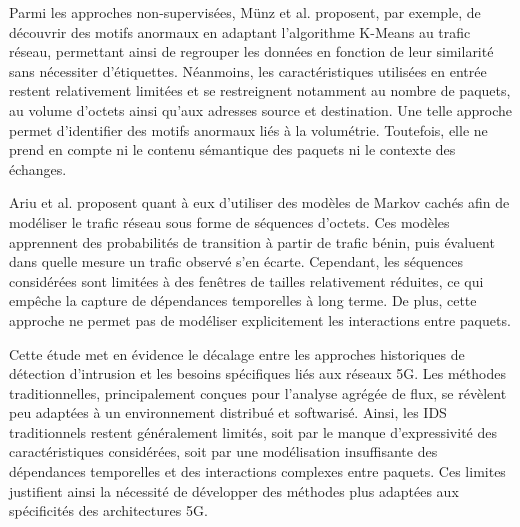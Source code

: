 \documentclass[a4paper,11pt,twoside]{StyleThese}
\begin{document}


Parmi les approches non-supervisées, Münz et al. \cite{kmeans} proposent, par exemple, de découvrir des motifs anormaux en adaptant l’algorithme K-Means au trafic réseau, permettant ainsi de regrouper les données en fonction de leur similarité sans nécessiter d’étiquettes. Néanmoins, les caractéristiques utilisées en entrée restent relativement limitées et se restreignent notamment au nombre de paquets, au volume d’octets ainsi qu’aux adresses source et destination. Une telle approche permet d’identifier des motifs anormaux liés à la volumétrie. Toutefois, elle ne prend en compte ni le contenu sémantique des paquets ni le contexte des échanges.

Ariu et al. \cite{markov} proposent quant à eux d'utiliser des modèles de Markov cachés afin de modéliser le trafic réseau sous forme de séquences d’octets. Ces modèles apprennent des probabilités de transition à partir de trafic bénin, puis évaluent dans quelle mesure un trafic observé s’en écarte. Cependant, les séquences considérées sont limitées à des fenêtres de tailles relativement réduites, ce qui empêche la capture de dépendances temporelles à long terme. De plus, cette approche ne permet pas de modéliser explicitement les interactions entre paquets.

Cette étude met en évidence le décalage entre les approches historiques de détection d’intrusion et les besoins spécifiques liés aux réseaux 5G. Les méthodes traditionnelles, principalement conçues pour l’analyse agrégée de flux, se révèlent peu adaptées à un environnement distribué et softwarisé. Ainsi, les IDS traditionnels restent généralement limités, soit par le manque d'expressivité des caractéristiques considérées, soit par une modélisation insuffisante des dépendances temporelles et des interactions complexes entre paquets. Ces limites justifient ainsi la nécessité de développer des méthodes plus adaptées aux spécificités des architectures 5G.
\end{document}
